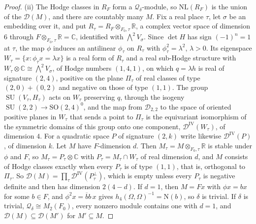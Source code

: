 \documentclass[11pt,reqno]{amsart}
\theoremstyle{plain}
\theoremstyle{definition}
\theoremstyle{remark}
\newcommand{\RR}{\mathbb{R}}
\newcommand{\CC}{\mathbb{C}}
\newcommand{\cD}{\mathcal{D}}
\newcommand{\cQ}{\mathcal{Q}}
\newcommand{\Nm}{\mathrm{N}}             %
\DeclareMathOperator{\SU}{SU}
\newcommand{\bbar}[1]{\overline{#1}}
\begin{document}
\begin{proof}
(ii) The Hodge classes in $R_{F}$ form a $\cQ_{\delta}$-module, so
$\mathrm{NL}(R_{F})$ is the union of the $\cD(M)$, and there are countably
many $M$. Fix a real place $\tau$, let $\sigma$ be an embedding over it, and
put $R_{\tau}=R_{F}\otimes_{F_{0},\tau}\RR$, a complex vector space of
dimension $6$ through $F\otimes_{F_{0},\tau}\RR=\CC$, identified with
$\bigwedge^{2}V_{\sigma}$. Since $\det H$ has sign $(-1)^{n}=1$ at $\tau$, the
map $\phi$ induces an antilinear $\phi_{\tau}$ on $R_{\tau}$ with
$\phi_{\tau}^{2}=\lambda^{2}$, $\lambda>0$. Its eigenspace
$W_{\tau}=\{x:\phi_{\tau}x=\lambda x\}$ is a real form of $R_{\tau}$ and a real
sub-Hodge structure with $W_{\tau}\otimes\CC\cong\bigwedge^{2}V_{\sigma}$, of
Hodge numbers $(1,4,1)$, on which $q=\lambda h$ is real of signature $(2,4)$,
positive on the plane $\Pi_{\tau}$ of real classes of type $(2,0)+(0,2)$ and
negative on those of type $(1,1)$. The group $\SU(V_{\tau},H_{\tau})$ acts on
$W_{\tau}$ preserving $q$, through the isogeny $\SU(2,2)\to\mathrm{SO}(2,4)^{0}$,
and the map from $\cD_{2,2}$ to the space of oriented positive planes in
$W_{\tau}$ that sends a point to $\Pi_{\tau}$ is the equivariant isomorphism of
the symmetric domains of this group onto one component,
$\cD^{\mathrm{IV}}(W_{\tau})$, of dimension $4$. For a quadratic space $P$ of
signature $(2,k)$ write likewise $\cD^{\mathrm{IV}}(P)$, of dimension $k$. Let
$M$ have $F$-dimension $d$. Then $M_{\tau}=M\otimes_{F_{0},\tau}\RR$ is stable
under $\phi$ and $F$, so $M_{\tau}=P_{\tau}\otimes\CC$ with
$P_{\tau}=M_{\tau}\cap W_{\tau}$ of real dimension $d$, and $M$ consists of
Hodge classes exactly when every $P_{\tau}$ is of type $(1,1)$, that is,
orthogonal to $\Pi_{\tau}$. So
$\cD(M)=\prod_{\tau}\cD^{\mathrm{IV}}(P_{\tau}^{\perp})$, which is empty unless
every $P_{\tau}$ is negative definite and then has dimension $2(4-d)$. If
$d=1$, then $M=Fx$ with $\phi x=bx$ for some $b\in F$, and
$\phi^{2}x=\bbar bb\,x$ gives $h_{4}(\Omega,\Omega)^{-1}=\Nm(b)$, so $\delta$ is
trivial. If $\delta$ is trivial, $\cQ_{\delta}\cong M_{2}(F_{0})$, every nonzero
module contains one with $d=1$, and $\cD(M)\subseteq\cD(M')$ for
$M'\subseteq M$.


\end{proof}
\end{document}
